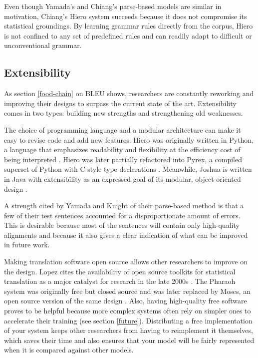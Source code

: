 \documentclass[11pt]{article}
\begin{document}
Even though Yamada's and Chiang's parse-based models are similar in motivation, Chiang's Hiero system
succeeds because it does not compromise its statistical groundings. By learning grammar rules
directly from the corpus, Hiero is not confined to any set of predefined rules and can readily adapt
to difficult or unconventional grammar.


\subsection{Extensibility}
As section \ref{food-chain} on BLEU shows, researchers are constantly reworking and improving their designs
to surpass the current state of the art. Extensibility comes in two types: building new strengths
and strengthening old weaknesses.

The choice of programming language and a modular architecture can make it easy to revise code and add new features.
Hiero was originally written in Python, a language that emphasizes readability and flexibility at the
efficiency cost of being interpreted \cite{chiang:05}. Hiero was later partially refactored into
Pyrex, a compiled superset of Python with C-style type declarations \cite{chiang:07}. 
Meanwhile, Joshua is written in Java with extensibility as an expressed goal of its modular, object-oriented
design \cite{joshua}.

A strength cited by Yamada and Knight \cite{yamada_knight} of their parse-based method is that a few of their
test sentences accounted for a disproportionate amount of errors. This is desirable
because most of the sentences will contain only high-quality alignments and because it also gives a clear indication of 
what can be improved in future work.

Making translation software open source allows other researchers to improve on the design.
Lopez cites the availability of open source toolkits for statistical translation as a major catalyst
for research in the late 2000s \cite{lopez}.
The Pharaoh system was originally free but closed source and was later replaced by Moses,
an open source version of the same design \cite{pharaoh, moses}.
Also, having high-quality free software proves to be helpful because more
complex systems often rely on simpler ones to accelerate their training (see section \ref{future}).
Distributing a free implementation of your system keeps other researchers
from having to reimplement it themselves, which saves their time and also ensures that your model will be fairly
represented when it is compared against other models.
\end{document}
